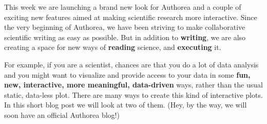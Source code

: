 This week we are launching a brand new look for Authorea and a couple of exciting new features aimed at making scientific research more interactive. Since the very beginning of Authorea, we have been striving to make collaborative scientific writing as easy as possible. But in addition to \textbf{writing}, we are also creating a space for new ways of \textbf{reading} science, and \textbf{executing} it.

For example, if you are a scientist, chances are that you do a lot of data analysis and you might want to visualize and provide access to your data in some \textbf{fun, new, interactive, more meaningful, data-driven} ways, rather than the usual static, data-less plot. There are many ways to create this kind of interactive plots. In this short blog post we will look at two of them. (Hey, by the way, we will soon have an official Authorea blog!)